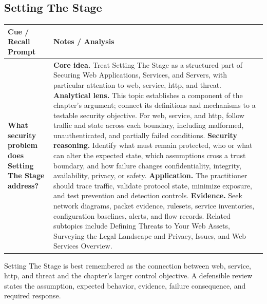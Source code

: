 \documentclass[11pt]{article}
\newcommand{\CornellHeader}{%
\rowcolor{Navy}\color{white}\bfseries Cue / Recall Prompt & \color{white}\bfseries Notes / Analysis\\\hline}
\newcommand{\CornellRow}[2]{%
\cellcolor{CueGray}\RaggedRight\textbf{#1} & \RaggedRight #2\\\hline}
\begin{document}
\subsection*{Setting The Stage}
\begin{longtable}{>{\RaggedRight\arraybackslash}p{}|>{\RaggedRight\arraybackslash}p{}}
\CornellHeader
\CornellRow{What security problem does Setting The Stage address?}{\textbf{Core idea.} Treat Setting The Stage as a structured part of Securing Web Applications, Services, and Servers, with particular attention to web, service, http, and threat. \textbf{Analytical lens.} This topic establishes a component of the chapter's argument; connect its definitions and mechanisms to a testable security objective. For web, service, and http, follow traffic and state across each boundary, including malformed, unauthenticated, and partially failed conditions. \textbf{Security reasoning.} Identify what must remain protected, who or what can alter the expected state, which assumptions cross a trust boundary, and how failure changes confidentiality, integrity, availability, privacy, or safety. \textbf{Application.} The practitioner should trace traffic, validate protocol state, minimize exposure, and test prevention and detection controls. \textbf{Evidence.} Seek network diagrams, packet evidence, rulesets, service inventories, configuration baselines, alerts, and flow records. Related subtopics include Defining Threats to Your Web Assets, Surveying the Legal Landscape and Privacy, Issues, and Web Services Overview.}
\end{longtable}
\begin{topicsummary}
Setting The Stage is best remembered as the connection between web, service, http, and threat and the chapter's larger control objective. A defensible review states the assumption, expected behavior, evidence, failure consequence, and required response.
\end{topicsummary}
\end{document}
